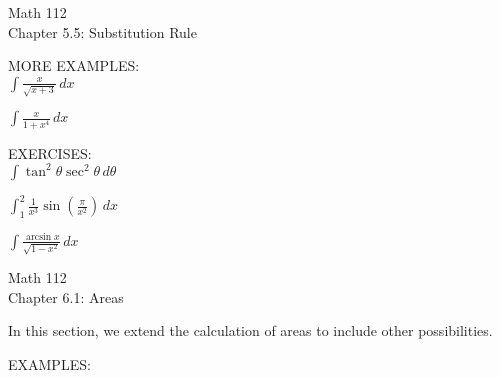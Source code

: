 \documentclass[11pt]{article}
\begin{document}
\begin{center}
\Large
\rm{Math 112}
\\
\rm{Chapter 5.5:  Substitution Rule}
\\
\end{center}
\vspace{0.2in}

MORE EXAMPLES:\\

$\int \frac{x}{\sqrt{x+3}} \, dx$

\vspace{2in}

$\int \frac{x}{1+x^4} \, dx$

\vspace{2in}


EXERCISES: \\

$\int \tan^2{\theta}\sec^2{\theta} \, d\theta$


\vspace{.7in}


$\int_1^2 \frac{1}{x^3}\sin{\left(\frac{\pi}{x^2} \right)} \, dx$


\vspace{0.7in}

$\int \frac{\arcsin{x}}{\sqrt{1-x^2}}  \, dx$


\vspace{0.7in}


\pagebreak
\begin{center}
\Large
\rm{Math 112}
\\
\rm{Chapter 6.1:  Areas}
\\
\end{center}
\vspace{0.2in}

In this section, we extend the calculation of areas to include other possibilities.


    \vspace{2in}


    EXAMPLES:
\end{document}
